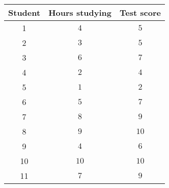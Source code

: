 \begin{tabular}{ccc}                    \toprule
Student & Hours studying & Test score \\\midrule
1       & $4$            & $5$        \\[6pt]
2       & $3$            & $5$        \\[6pt]
3       & $6$            & $7$        \\[6pt]
4       & $2$            & $4$        \\[6pt]
5       & $1$            & $2$        \\[6pt]
6       & $5$            & $7$        \\[6pt]
7       & $8$            & $9$        \\[6pt]
8       & $9$            & $10$       \\[6pt]
9       & $4$            & $6$        \\[6pt]
10      & $10$           & $10$       \\[6pt]
11      & $7$            & $9$        \\\bottomrule
\end{tabular}
